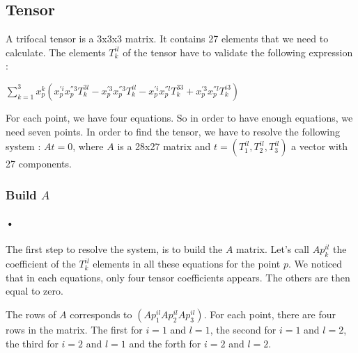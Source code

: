 \documentclass{report}
\begin{document}
\subsection{Tensor}

A trifocal tensor is a 3x3x3 matrix. It contains 27 elements that we need to calculate. The elements $T_{k}^{il}$ of the tensor have to validate the following expression : 
\begin{center}
 $ \displaystyle { \sum_{k = 1}^{3}} x_{p}^{k}(x_{p}^{'i}x_{p}^{''3}T_{k}^{3l} - x_{p}^{'3}x_{p}^{''3}T_{k}^{il} - x_{p}^{'i}x_{p}^{''l}T_{k}^{33} + x_{p}^{'3}x_{p}^{''l}T_{k}^{i3})$ 
\end{center}
For each point, we have four equations. So in order to have enough equations, we need seven points. 
In order to find the tensor, we have to resolve the following system : $At = 0$, where $A$ is a 28x27 matrix and $t = ( T_{1}^{il}, T_{2}^{il}, T_{3}^{il})$ a vector with 27 components.

\subsubsection{Build $A$}
\paragraph{•}

The first step to resolve the system, is to build the $A$ matrix. Let's call $Ap_{k}^{il}$ the coefficient of the $T_{k}^{il}$ elements in all these equations for the point $p$. We noticed that in each equations, only four tensor coefficients appears. The others are then equal to zero. 

The rows of $A$ corresponds to $( Ap_{1}^{il}  Ap_{2}^{il}  Ap_{3}^{il} )$.
For each point, there are four rows in the matrix. The first for $i=1$ and $l=1$, the second for $i=1$ and $l=2$, the third for $i=2$ and $l=1$ and the forth for $i=2$ and $l=2$.
\end{document}
